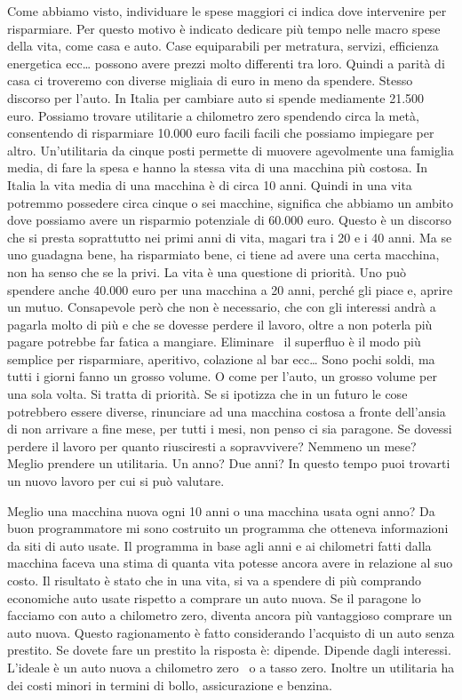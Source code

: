 \documentclass[12pt]{book} %
\begin{document}
Come abbiamo visto, individuare le spese maggiori ci indica dove intervenire per risparmiare. Per questo motivo è
indicato dedicare più tempo nelle macro spese della vita, come casa e auto. Case equiparabili per metratura, servizi,
efficienza energetica ecc… possono avere prezzi molto differenti tra loro. Quindi a parità di casa ci troveremo con
diverse migliaia di euro in meno da spendere. Stesso discorso per l'auto. In Italia per cambiare
auto si spende mediamente 21.500
euro. Possiamo trovare utilitarie a chilometro zero spendendo circa la metà, consentendo di risparmiare 10.000 euro facili
facili che possiamo impiegare per altro. Un'utilitaria da cinque posti permette di muovere
agevolmente una famiglia media, di fare la spesa e hanno la stessa vita di una macchina più costosa. In Italia la vita
media di una macchina è di circa 10 anni. Quindi in una vita potremmo possedere circa cinque o sei macchine, significa
che abbiamo un ambito dove possiamo avere un risparmio potenziale di 60.000 euro. Questo è un discorso che si presta
soprattutto nei primi anni di vita, magari tra i 20 e i 40 anni. Ma se uno guadagna bene, ha risparmiato bene, ci tiene
ad avere una certa macchina, non ha senso che se la privi. La vita è una questione di priorità. Uno può spendere anche
40.000 euro per una macchina a 20 anni, perché gli piace e, aprire un mutuo. Consapevole però che non è necessario, che
con gli interessi andrà a pagarla molto di più e che se dovesse perdere il lavoro, oltre a non poterla più pagare
potrebbe far fatica a mangiare. Eliminare \ il superfluo è il modo più semplice per risparmiare, aperitivo, colazione
al bar ecc… Sono pochi soldi, ma tutti i giorni fanno un grosso volume. O come per l'auto, un
grosso volume per una sola volta. Si tratta di priorità. Se si ipotizza che in un futuro le cose potrebbero essere
diverse, rinunciare ad una macchina costosa a fronte dell'ansia di non arrivare a fine mese, per
tutti i mesi, non penso ci sia paragone. Se dovessi perdere il lavoro per quanto riusciresti a sopravvivere? Nemmeno un
mese? Meglio prendere un utilitaria. Un anno? Due anni? In questo tempo puoi trovarti un nuovo lavoro per cui si può
valutare.

Meglio una macchina nuova ogni 10 anni o una macchina usata ogni anno? Da buon programmatore mi sono costruito un
programma che otteneva informazioni da siti di auto usate. Il programma in base agli anni e ai chilometri fatti dalla
macchina faceva una stima di quanta vita potesse ancora avere in relazione al suo costo. Il risultato è stato che in
una vita, si va a spendere di più comprando economiche auto usate rispetto a comprare un auto nuova. Se il paragone lo
facciamo con auto a chilometro zero, diventa ancora più vantaggioso comprare un auto nuova. Questo ragionamento è fatto
considerando l'acquisto di un auto senza prestito. Se dovete fare un prestito la risposta è:
dipende. Dipende dagli interessi. L'ideale è un auto nuova a chilometro zero \ o a tasso zero.
Inoltre un utilitaria ha dei costi minori in termini di bollo, assicurazione e benzina.
\end{document}
